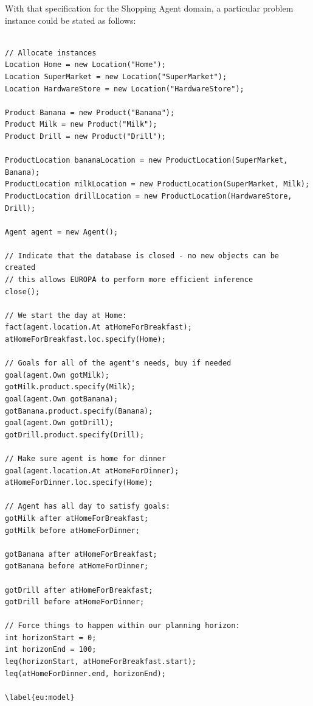 With that specification for the Shopping Agent domain, a particular
problem instance could be stated as follows:

\begin{verbatim}

// Allocate instances
Location Home = new Location("Home");
Location SuperMarket = new Location("SuperMarket");
Location HardwareStore = new Location("HardwareStore");

Product Banana = new Product("Banana");
Product Milk = new Product("Milk");
Product Drill = new Product("Drill");

ProductLocation bananaLocation = new ProductLocation(SuperMarket, Banana);
ProductLocation milkLocation = new ProductLocation(SuperMarket, Milk);
ProductLocation drillLocation = new ProductLocation(HardwareStore, Drill);

Agent agent = new Agent();

// Indicate that the database is closed - no new objects can be created
// this allows EUROPA to perform more efficient inference
close();

// We start the day at Home:
fact(agent.location.At atHomeForBreakfast);
atHomeForBreakfast.loc.specify(Home);

// Goals for all of the agent's needs, buy if needed
goal(agent.Own gotMilk);
gotMilk.product.specify(Milk);
goal(agent.Own gotBanana);
gotBanana.product.specify(Banana);
goal(agent.Own gotDrill);
gotDrill.product.specify(Drill);

// Make sure agent is home for dinner
goal(agent.location.At atHomeForDinner);
atHomeForDinner.loc.specify(Home);

// Agent has all day to satisfy goals:
gotMilk after atHomeForBreakfast;
gotMilk before atHomeForDinner;

gotBanana after atHomeForBreakfast;
gotBanana before atHomeForDinner;

gotDrill after atHomeForBreakfast;
gotDrill before atHomeForDinner;

// Force things to happen within our planning horizon:
int horizonStart = 0;
int horizonEnd = 100;
leq(horizonStart, atHomeForBreakfast.start);
leq(atHomeForDinner.end, horizonEnd);

\label{eu:model}
\end{verbatim}

